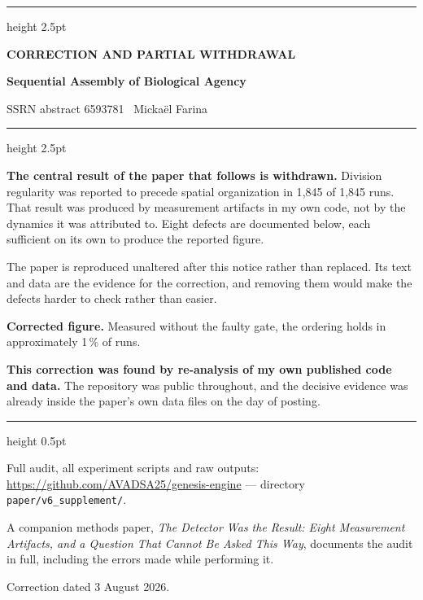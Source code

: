 \documentclass[11pt,letterpaper]{article}
\begin{document}
\thispagestyle{front}
\vspace*{0.4in}
{\color{warn}\hrule height 2.5pt}
\vspace{10pt}
{\Large\bfseries\color{warn} CORRECTION AND PARTIAL WITHDRAWAL}

\vspace{4pt}
{\large\bfseries Sequential Assembly of Biological Agency}

\vspace{2pt}
SSRN abstract 6593781 \textperiodcentered\ Micka\"el Farina
\vspace{8pt}
{\color{warn}\hrule height 2.5pt}

\vspace{16pt}
\textbf{The central result of the paper that follows is withdrawn.}
Division regularity was reported to precede spatial organization in
1{,}845 of 1{,}845 runs. That result was produced by measurement
artifacts in my own code, not by the dynamics it was attributed to.
Eight defects are documented below, each sufficient on its own to
produce the reported figure.

The paper is reproduced unaltered after this notice rather than
replaced. Its text and data are the evidence for the correction, and
removing them would make the defects harder to check rather than
easier.

\vspace{10pt}
\textbf{Corrected figure.} Measured without the faulty gate, the
ordering holds in approximately 1\,\% of runs.

\vspace{10pt}
\textbf{This correction was found by re-analysis of my own published
code and data.} The repository was public throughout, and the decisive
evidence was already inside the paper's own data files on the day of
posting.

\vspace{14pt}
{\color{rule}\hrule height 0.5pt}
\vspace{6pt}
{\small
Full audit, all experiment scripts and raw outputs:
\url{https://github.com/AVADSA25/genesis-engine} ---
directory \texttt{paper/v6\_supplement/}.

A companion methods paper, \emph{The Detector Was the Result: Eight
Measurement Artifacts, and a Question That Cannot Be Asked This Way},
documents the audit in full, including the errors made while
performing it.

\vspace{4pt}
Correction dated 3 August 2026.
}
\end{document}
